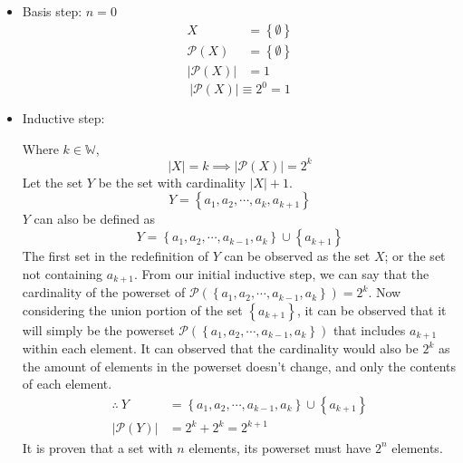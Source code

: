 \documentclass{article}
\begin{document}
\begin{itemize}
	\item Basis step: $ n = 0 $
	      \begin{align*}
		      X                             & = \left\{ \emptyset \right\} \\
		      \mathcal{P}(X)                & = \left\{ \emptyset \right\} \\
		      \left| \mathcal{P}(X) \right| & = 1
	      \end{align*}
	      \begin{equation*}
		      \left| \mathcal{P}(X) \right| \equiv 2^0 = 1
	      \end{equation*}

	\item Inductive step:

	      Where $ k \in \mathbb{W} $,
	      \begin{equation*}
		      \left| X \right| = k \implies \left| \mathcal{P}(X) \right| = 2^k
	      \end{equation*}
	      Let the set $ Y $ be the set with cardinality $ \left| X \right| + 1 $.
	      \begin{equation*}
		      Y = \left\{ a_1, a_2, \cdots, a_k, a_{k + 1} \right\}
	      \end{equation*}
	      $ Y $ can also be defined as
	      \begin{equation*}
		      Y = \left\{ a_1, a_2, \cdots, a_{k - 1}, a_k \right\} \cup \left\{ a_{k + 1} \right\}
	      \end{equation*}
	      The first set in the redefinition of $ Y $ can be observed as the set $ X $; or the set not containing $ a_{k + 1} $. From our initial inductive step, we can say that the cardinality of the powerset of $ \mathcal{P} \left( \left\{ a_1, a_2, \cdots, a_{k - 1}, a_k \right\} \right) = 2^k $. Now considering the union portion of the set $ \left\{ a_{k + 1} \right\} $, it can be observed that it will simply be the powerset $ \mathcal{P} \left( \left\{ a_1, a_2, \cdots, a_{k - 1}, a_k \right\} \right) $ that includes $ a_{k + 1} $ within each element. It can observed that the cardinality would also be $ 2^k $ as the amount of elements in the powerset doesn't change, and only the contents of each element.
	      \begin{align*}
		      \therefore\ Y                 & = \left\{ a_1, a_2, \cdots, a_{k - 1}, a_k \right\} \cup \left\{ a_{k + 1} \right\} \\
		      \left| \mathcal{P}(Y) \right| & = 2^k + 2^k = 2^{k + 1}
	      \end{align*}
	      It is proven that a set with $ n $ elements, its powerset must have $ 2^n $ elements.
\end{itemize}
\end{document}
